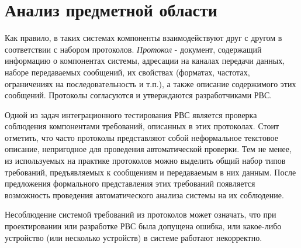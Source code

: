 \section{Анализ предметной области}

Как правило, в таких системах компоненты взаимодействуют друг с другом в 
соответствии с набором протоколов. \textit{Протокол} - документ, содержащий 
информацию о компонентах системы, адресации на каналах передачи данных, наборе 
передаваемых сообщений, их свойствах (форматах, частотах, ограничениях на 
последовательность и т.п.), а также описание содержимого этих сообщений. 
Протоколы согласуются и утверждаются разработчиками РВС.

Одной из задач интеграционного тестирования РВС является проверка соблюдения 
компонентами требований, описанных в этих протоколах. Стоит отметить, 
что часто протоколы представляют собой неформальное текстовое описание, 
непригодное для проведения автоматической проверки. Тем не менее, из 
используемых на практике протоколов можно выделить общий набор типов 
требований, 
предъявляемых к сообщениям и передаваемым в них данным. После предложения 
формального представления этих требований появляется возможность проведения 
автоматического анализа системы на их соблюдение.

Несоблюдение системой требований из протоколов может означать, что при 
проектировании или разработке РВС была допущена ошибка, или какое-либо 
устройство (или несколько устройств) в системе работают некорректно.